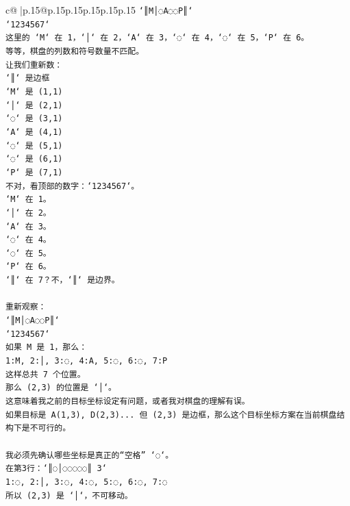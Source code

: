 \documentclass{article}
\begin{document}
{\begin{supertabular}{c@{$\;$}|p{.15\linewidth}@{}p{.15\linewidth}p{.15\linewidth}p{.15\linewidth}p{.15\linewidth}p{.15\linewidth}}
{{{\texttt{`║M│◌A◌◌P║`} \\
\texttt{`1234567`} \\
\texttt{这里的 `M` 在 1，`│` 在 2，`A` 在 3，`◌` 在 4，`◌` 在 5，`P` 在 6。} \\
\texttt{等等，棋盘的列数和符号数量不匹配。} \\
\texttt{让我们重新数：} \\
\texttt{`║` 是边框} \\
\texttt{`M` 是 (1,1)} \\
\texttt{`│` 是 (2,1)} \\
\texttt{`◌` 是 (3,1)} \\
\texttt{`A` 是 (4,1)} \\
\texttt{`◌` 是 (5,1)} \\
\texttt{`◌` 是 (6,1)} \\
\texttt{`P` 是 (7,1)} \\
\texttt{不对，看顶部的数字：`1234567`。} \\
\texttt{`M` 在 1。} \\
\texttt{`│` 在 2。} \\
\texttt{`A` 在 3。} \\
\texttt{`◌` 在 4。} \\
\texttt{`◌` 在 5。} \\
\texttt{`P` 在 6。} \\
\texttt{`║` 在 7？不，`║` 是边界。} \\
\\ 
\texttt{重新观察：} \\
\texttt{`║M│◌A◌◌P║`} \\
\texttt{`1234567`} \\
\texttt{如果 M 是 1，那么：} \\
\texttt{1:M, 2:│, 3:◌, 4:A, 5:◌, 6:◌, 7:P} \\
\texttt{这样总共 7 个位置。} \\
\texttt{那么 (2,3) 的位置是 `│`。} \\
\texttt{这意味着我之前的目标坐标设定有问题，或者我对棋盘的理解有误。} \\
\texttt{如果目标是 A(1,3), D(2,3)... 但 (2,3) 是边框，那么这个目标坐标方案在当前棋盘结构下是不可行的。} \\
\\ 
\texttt{我必须先确认哪些坐标是真正的“空格” `◌`。} \\
\texttt{在第3行：`║◌│◌◌◌◌◌║ 3`} \\
\texttt{1:◌, 2:│, 3:◌, 4:◌, 5:◌, 6:◌, 7:◌} \\
\texttt{所以 (2,3) 是 `│`，不可移动。} \\
}}}
\end{supertabular}}
\end{document}
